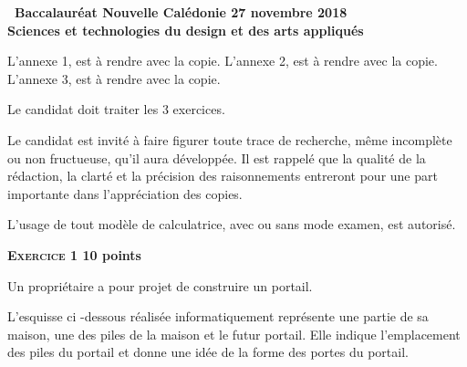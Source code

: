 \documentclass[10pt]{article}
\begin{document}
\setlength\parindent{0mm}
\pagestyle{fancy}
\thispagestyle{empty}

\begin{center}
{\large \textbf{\decofourleft~Baccalauréat  Nouvelle Calédonie 27 novembre 2018~\decofourright}\\[5pt]\textbf{Sciences et technologies du design et des arts appliqués}} 

\medskip

L'annexe 1, est à rendre avec la copie. L'annexe 2, est à rendre avec la copie. L'annexe 3, est à rendre avec la copie. 
\end{center}

\vspace{0,5cm}

Le candidat doit traiter les 3 exercices. 

Le candidat est invité à faire figurer toute trace de recherche, même incomplète ou non fructueuse, qu'il aura développée. Il est rappelé que la qualité de la rédaction, la clarté et la précision des raisonnements entreront pour une part importante dans l'appréciation des copies. 

L'usage de tout modèle de calculatrice, avec ou sans mode examen, est autorisé. 

\bigskip

\textbf{\textsc{Exercice 1}  \hfill 10 points}

\medskip

Un propriétaire a pour projet de construire un portail. 

L'esquisse ci -dessous réalisée informatiquement représente une partie de sa maison, une des piles de la maison et le futur portail. Elle indique l'emplacement des piles du portail et donne une idée de la forme des portes du portail. 
\end{document}
